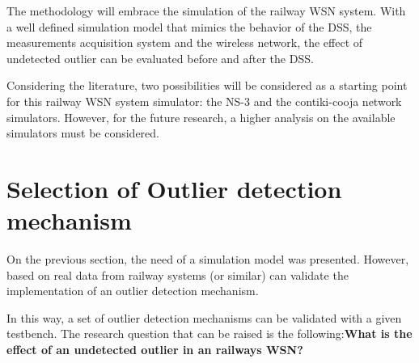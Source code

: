 The methodology will embrace the simulation of the railway WSN system. With a well defined simulation model that mimics the behavior of the DSS, the measurements acquisition system and the wireless network, the effect of undetected outlier can be evaluated before and after the DSS.

Considering the literature, two possibilities will be considered as a starting point for this railway WSN system simulator: the NS-3 and the contiki-cooja network simulators. However, for the future research, a higher analysis on the available simulators must be considered.


\section{Selection of Outlier detection mechanism}

On the previous section, the need of a simulation model was presented. However, based on real data from railway systems (or similar) can validate the implementation of an outlier detection mechanism.

In this way, a set of outlier detection mechanisms can be validated with a given testbench. The research question that can be raised is the following:\textbf{What is the effect of an undetected outlier in an railways WSN?}


